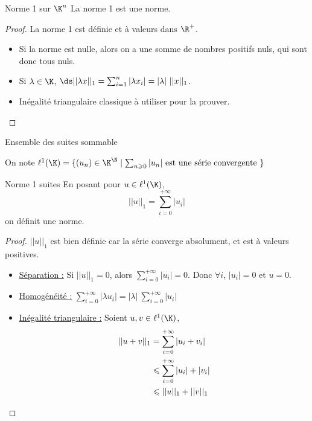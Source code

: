\begin{theoreme}{Norme 1 sur $\K^n$}{}
    La norme 1 est une norme.
\end{theoreme}

\begin{proof}
    La norme 1 est définie et à valeurs dans $\R^+$. 

    \begin{itemize}
        \item Si la norme est nulle, alors on a une somme de nombres positifs nuls, qui sont donc tous nuls. 
        \item Si $\lambda \in \K$, $\ds ||\lambda x ||_1 = \sum_{i = 1}^n|\lambda x_i | = |\lambda| ~ ||x||_1$.
        \item  Inégalité triangulaire classique à utiliser pour la prouver. 
    \end{itemize}
\end{proof}

\begin{definition}{Ensemble des suites sommable}{}

    On note $\ell^1(\K) = \{(u_n) \in \K^{\N} \mid \sum_{n \geqslant 0} |u_n| ~ \text{est une série convergente} ~ \}$
\end{definition}

\begin{theoreme}{Norme 1 suites}{}
    En posant pour $u \in \ell^1(\K)$,
    \[||u||_1 = \sum_{i = 0}^{+ \infty }|u_i|\] 
    on définit une norme. 
\end{theoreme}

\begin{proof}
    $|| u ||_1$ est bien définie car la série converge absolument, et est à valeurs positives.

    \begin{itemize}
        \item \uline{Séparation :}
        Si $||u ||_1 = 0$, alors $\displaystyle \sum_{i = 0}^{+ \infty}  |u_i| = 0 $.
        Donc $\forall i$, $|u_i| = 0 $ et $u = 0$. 

        \item \uline{Homogénéité :}
        $\displaystyle \sum_{ i = 0 }^{+ \infty } |\lambda u_i| = |\lambda| ~ \sum_{i = 0 }^{+ \infty } |u_i|$
        
        \item \uline{Inégalité triangulaire :} Soient $u, v \in \ell^1(\K)$,
        \[ \displaystyle
            \begin{aligned}
                ||u + v ||_1 & =  \sum_{i = 0 }^{+ \infty } |u_i + v_i| \\
                \space & \leqslant  \sum_{i = 0}^{+ \infty} |u_i| + |v_i| \\
                \space & \leqslant  ||u||_1 + ||v||_1 \\
            \end{aligned}
        \]
    \end{itemize}
\end{proof}

